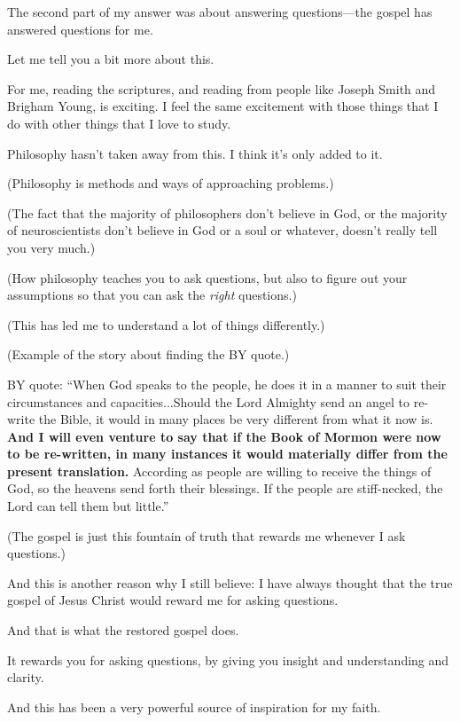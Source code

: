 \begin{compactitem}
			\item The second part of my answer was about answering questions---the gospel has answered questions for me.
				\begin{compactitem}
					\item Let me tell you a bit more about this.
					\item For me, reading the scriptures, and reading from people like Joseph Smith and Brigham Young, is exciting. I feel the same excitement with those things that I do with other things that I love to study.
					\item Philosophy hasn't taken away from this. I think it's only added to it.
					\item (Philosophy is methods and ways of approaching problems.)
					\item (The fact that the majority of philosophers don't believe in God, or the majority of neuroscientists don't believe in God or a soul or whatever, doesn't really tell you very much.)
					\item (How philosophy teaches you to ask questions, but also to figure out your assumptions so that you can ask the \textit{right} questions.) 
					\item (This has led me to understand a lot of things differently.)
					\item (Example of the story about finding the BY quote.)
					\item BY quote: ``When God speaks to the people, he does it in a manner to suit their circumstances and capacities...Should the Lord Almighty send an angel to re-write the Bible, it would in many places be very different from what it now is. \textbf{And I will even venture to say that if the Book of Mormon were now to be re-written, in many instances it would materially differ from the present translation.} According as people are willing to receive the things of God, so the heavens send forth their blessings. If the people are stiff-necked, the Lord can tell them but little.''
					\item (The gospel is just this fountain of truth that rewards me whenever I ask questions.)
				\end{compactitem}
				
			\item And this is another reason why I still believe: I have always thought that the true gospel of Jesus Christ would reward me for asking questions.
				\begin{compactitem}
					\item And that is what the restored gospel does.
					\item It rewards you for asking questions, by giving you insight and understanding and clarity.
					\item And this has been a very powerful source of inspiration for my faith.
				\end{compactitem}
				

\end{compactitem}
